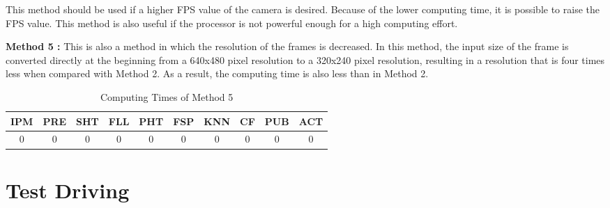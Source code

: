 This method should be used if a higher FPS value of the camera is desired. Because of the lower computing time, it is possible to raise the FPS value. This method is also useful if the processor is not powerful enough for a high computing effort.



\textbf{Method 5 : }This is also a method in which the resolution of the frames is decreased. In this method, the input size of the frame is converted directly at the beginning from a 640x480 pixel resolution to a 320x240 pixel resolution, resulting in a resolution that is four times less when compared with Method 2. As a result, the computing time is also less than in Method 2.


\begin{table}[ht]
\caption{Computing Times of Method 5} 
\centering 
  \begin{tabular}{ | c | c | c | c | c | c | c | c | c | c |}
    \hline
  
  IPM 		& PRE 		& SHT	   & FLL 	   & PHT 	   & FSP 	    & KNN 	   & CF 	  & PUB 	& ACT \\ \hline  
  0   &  0  &  0  &  0  &  0  &  0 &  0  &  0  & 0 & 0\\ \hline  
    
    
      \end{tabular}
  \label{tab:Case5_Times}
\end{table}




\section{Test Driving}\label{sec:Test Driving}


